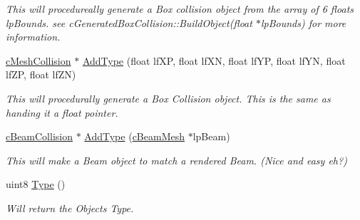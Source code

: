 \begin{DoxyCompactItemize}
\begin{DoxyCompactList}\small\item\em This will procedureally generate a Box collision object from the array of 6 floats lpBounds. see cGeneratedBoxCollision::BuildObject(float $\ast$lpBounds) for more information. \end{DoxyCompactList}\item 
\hypertarget{classc_compound_collision_a094a1e2b828fc8bd1ce0e5ab903125d6}{
\hyperlink{classc_mesh_collision}{cMeshCollision} $\ast$ \hyperlink{classc_compound_collision_a094a1e2b828fc8bd1ce0e5ab903125d6}{AddType} (float lfXP, float lfXN, float lfYP, float lfYN, float lfZP, float lfZN)}
\label{classc_compound_collision_a094a1e2b828fc8bd1ce0e5ab903125d6}

\begin{DoxyCompactList}\small\item\em This will procedurally generate a Box Collision object. This is the same as handing it a float pointer. \end{DoxyCompactList}\item 
\hypertarget{classc_compound_collision_a8b37e865b51fd5864582f8388ab4f1c4}{
\hyperlink{classc_beam_collision}{cBeamCollision} $\ast$ \hyperlink{classc_compound_collision_a8b37e865b51fd5864582f8388ab4f1c4}{AddType} (\hyperlink{classc_beam_mesh}{cBeamMesh} $\ast$lpBeam)}
\label{classc_compound_collision_a8b37e865b51fd5864582f8388ab4f1c4}

\begin{DoxyCompactList}\small\item\em This will make a Beam object to match a rendered Beam. (Nice and easy eh?) \end{DoxyCompactList}\item 
\hypertarget{classc_compound_collision_ad96f10a72496cb8879cf7b82d5403f81}{
uint8 \hyperlink{classc_compound_collision_ad96f10a72496cb8879cf7b82d5403f81}{Type} ()}
\label{classc_compound_collision_ad96f10a72496cb8879cf7b82d5403f81}

\begin{DoxyCompactList}\small\item\em Will return the Objects Type. \end{DoxyCompactList}\end{DoxyCompactItemize}


